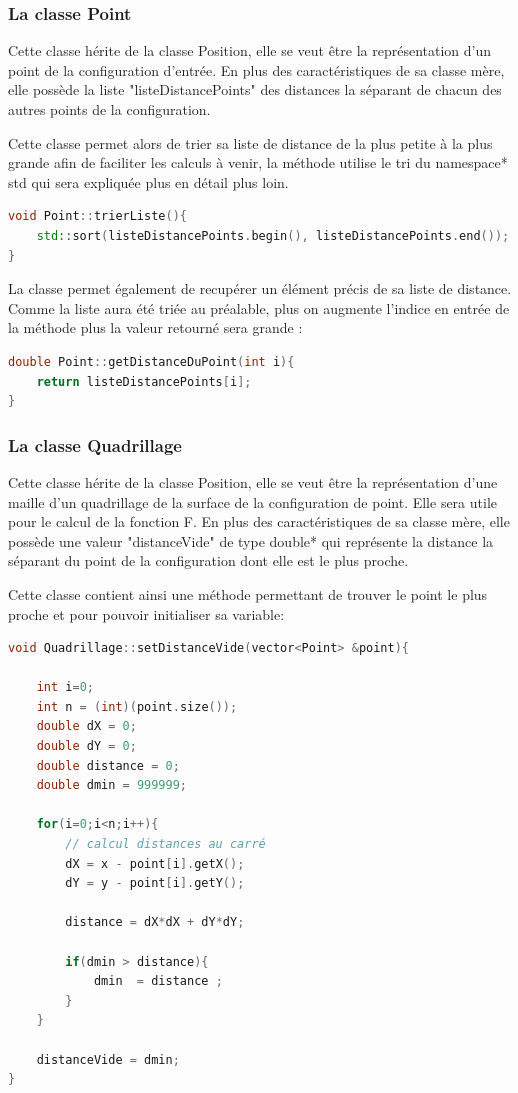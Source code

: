 \documentclass[stage2a]{tnreport}
\begin{document}
\subsubsection{La classe Point}
Cette classe hérite de la classe Position, elle se veut être la représentation d'un point de la configuration d'entrée. En plus des caractéristiques de sa classe mère, elle possède la liste "listeDistancePoints" des distances la séparant de chacun des autres points de la configuration.

Cette classe permet alors de trier sa liste de distance de la plus petite à la plus grande afin de faciliter les calculs à venir, la méthode utilise le tri du \gls{namespace}* std qui sera expliquée plus en détail plus loin.
\begin{lstlisting}[language=C++, caption={Méthode triant la liste de distance}, label={lst:triListe}]
void Point::trierListe(){
	std::sort(listeDistancePoints.begin(), listeDistancePoints.end());
}
\end{lstlisting}

La classe permet également de recupérer un élément précis de sa liste de distance. Comme la liste aura été triée au préalable, plus on augmente l'indice en entrée de la méthode plus la valeur retourné sera grande :

\begin{lstlisting}[language=C++, caption={Méthode donnant le ième élément de la liste de distances}, label={lst:getDistanceDuPoint}]
double Point::getDistanceDuPoint(int i){
	return listeDistancePoints[i];
}
\end{lstlisting}


\subsubsection{La classe Quadrillage}
Cette classe hérite de la classe Position, elle se veut être la représentation d'une maille d'un quadrillage de la surface de la configuration de point. Elle sera utile pour le calcul de la fonction F. En plus des caractéristiques de sa classe mère, elle possède une valeur "distanceVide" de type \gls{double}* qui représente la distance la séparant du point de la configuration dont elle est le plus proche.

Cette classe contient ainsi une méthode permettant de trouver le point le plus proche et pour pouvoir initialiser sa variable:

\begin{lstlisting}[language=C++, caption={Méthode trouvant le point le plus proche d'une maille du Quadrillage}, label={lst:setDistanceVide}]
void Quadrillage::setDistanceVide(vector<Point> &point){
	
	int i=0;
	int n = (int)(point.size());
	double dX = 0;
	double dY = 0;
	double distance = 0;
	double dmin = 999999;

	for(i=0;i<n;i++){
		// calcul distances au carré
		dX = x - point[i].getX();
		dY = y - point[i].getY();

		distance = dX*dX + dY*dY;

		if(dmin > distance){
			dmin  = distance ;
		}
	}

	distanceVide = dmin;
}
\end{lstlisting}
\end{document}
